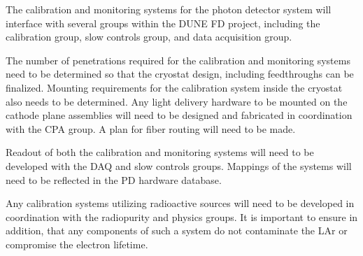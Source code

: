 

The calibration and monitoring systems for the photon detector system will interface with several groups within the DUNE FD project, including the calibration group, slow controls group, and data acquisition group.

The number of penetrations required for the calibration and monitoring systems need to be determined so that the cryostat design, including feedthroughs can be finalized. Mounting requirements for the calibration system inside the cryostat also needs to be determined. Any light delivery hardware to be mounted on the cathode plane assemblies will need to be designed and fabricated in coordination with the CPA group. A plan for fiber routing will need to be made. 

Readout of both the calibration and monitoring systems will need to be developed with the DAQ and slow controls groups. Mappings of the systems will need to be reflected in the PD hardware database.

Any calibration systems utilizing radioactive sources will need to be developed in coordination with the radiopurity and physics groups. It is important to ensure in addition, that any components of such a system do not contaminate the LAr or compromise the electron lifetime.

 

